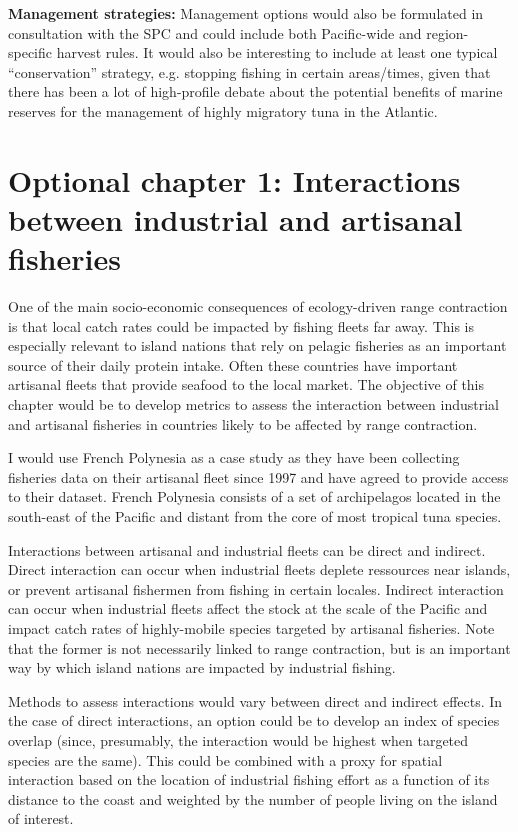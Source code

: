 \documentclass{article}
\begin{document}
\noindent\textbf{Management strategies:} Management options would also be
formulated in consultation with the SPC and could include both
Pacific-wide and region-specific harvest rules. It would also be
interesting to include at least one typical ``conservation''
strategy, e.g. stopping fishing in certain areas/times, given that
there has been a lot of high-profile debate about the potential
benefits of marine reserves for the management of highly migratory tuna
in the Atlantic.


\newpage
\section*{Optional chapter 1: Interactions between industrial and artisanal
  fisheries}

One of the main socio-economic consequences of ecology-driven range
contraction is that local catch rates could be impacted by fishing
fleets far away. This is especially relevant to island nations that
rely on pelagic fisheries as an important source of their daily
protein intake. Often these countries have important artisanal fleets
that provide seafood to the local market. The objective of this
chapter would be to develop metrics to assess the interaction between
industrial and artisanal fisheries in countries likely to be affected
by range contraction.

I would use French Polynesia as a case study as they have been
collecting fisheries data on their artisanal fleet since 1997 and have
agreed to provide access to their dataset. French Polynesia consists
of a set of archipelagos located in the south-east of the Pacific and distant
from the core of most tropical tuna species.

Interactions between artisanal and industrial fleets can be direct
and indirect. Direct interaction can occur when industrial fleets
deplete ressources near islands, or prevent artisanal fishermen from
fishing in certain locales. Indirect interaction can occur when
industrial fleets affect the stock at the scale of the Pacific and
impact catch rates of highly-mobile species targeted by artisanal
fisheries. Note that the former is not necessarily linked to range
contraction, but is an important way by which island nations are
impacted by industrial fishing.

Methods to assess interactions would vary between direct and indirect
effects. In the case of direct interactions, an option could be to
develop an index of species overlap (since, presumably, the interaction would be
highest when targeted species are the same). This could be combined
with a proxy for spatial interaction based on the location of industrial fishing
effort as a function of its distance to the coast and weighted by the
number of people living on the island of interest.
\end{document}
